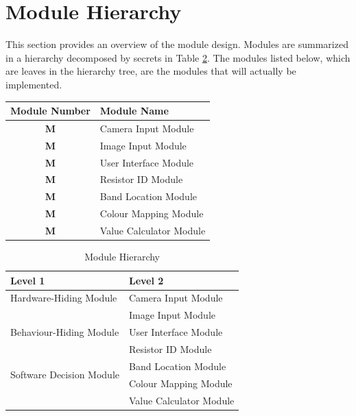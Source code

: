 \documentclass[12pt, titlepage]{article}
\newcounter{mnum}
\newcommand{\mthemnum}{M\themnum}
\begin{document}
\section{Module Hierarchy} \label{SecMH}

This section provides an overview of the module design. Modules are summarized
in a hierarchy decomposed by secrets in Table \ref{TblMH}. The modules listed
below, which are leaves in the hierarchy tree, are the modules that will
actually be implemented.

\begin{table}[h]
\centering
\label{my-label}
\begin{tabular}{cl}
\hline
\multicolumn{1}{l}{\textbf{Module Number}} & \textbf{Module Name}    \\ \hline
\textbf{{mnum} \mthemnum \label{mCI}}                                & Camera Input Module     \\ \hline
\textbf{{mnum} \mthemnum \label{mII}}                                & Image Input Module      \\ \hline
\textbf{{mnum} \mthemnum \label{mUI}}                                & User Interface Module   \\ \hline
\textbf{{mnum} \mthemnum \label{mRID}}                                & Resistor ID Module      \\ \hline
\textbf{{mnum} \mthemnum \label{mBL}}                                & Band Location Module    \\ \hline
\textbf{{mnum} \mthemnum \label{mCM}}                                & Colour Mapping Module   \\ \hline
\textbf{{mnum} \mthemnum \label{mVC}}                                & Value Calculator Module \\ \hline
\end{tabular}
\end{table}

\begin{table}[h!]
\centering
\begin{tabular}{p{} p{}}
\toprule
\textbf{Level 1} & \textbf{Level 2}\\
\midrule

{Hardware-Hiding Module} 
& Camera Input Module\\
& Image Input Module \\
\midrule

\multirow{1}{0.3\textwidth}{Behaviour-Hiding Module}
& User Interface Module\\
\midrule

\multirow{4}{0.3\textwidth}{Software Decision Module}
& Resistor ID Module \\
& Band Location Module \\
& Colour Mapping Module \\
& Value Calculator Module\\
\bottomrule

\end{tabular}
\caption{Module Hierarchy}
\label{TblMH}
\end{table}
\end{document}
